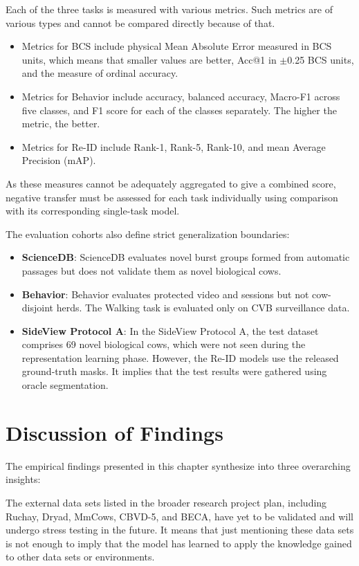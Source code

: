 Each of the three tasks is measured with various metrics. Such metrics are of various types and cannot be compared directly because of that.
\begin{itemize}
 \item Metrics for BCS include physical Mean Absolute Error measured in BCS units, which means that smaller values are better, Acc@1 in $\pm$0.25 BCS units, and the measure of ordinal accuracy.
 \item Metrics for Behavior include accuracy, balanced accuracy, Macro-F1 across five classes, and F1 score for each of the classes separately. The higher the metric, the better.
 \item Metrics for Re-ID include Rank-1, Rank-5, Rank-10, and mean Average Precision (mAP).
\end{itemize}
As these measures cannot be adequately aggregated to give a combined score, negative transfer must be assessed for each task individually using comparison with its corresponding single-task model.

The evaluation cohorts also define strict generalization boundaries:
\begin{itemize}
 \item \textbf{ScienceDB}: ScienceDB evaluates novel burst groups formed from automatic passages but does not validate them as novel biological cows.
 \item \textbf{Behavior}: Behavior evaluates protected video and sessions but not cow-disjoint herds. The Walking task is evaluated only on CVB surveillance data.
 \item \textbf{SideView Protocol A}: In the SideView Protocol A, the test dataset comprises 69 novel biological cows, which were not seen during the representation learning phase. However, the Re-ID models use the released ground-truth masks. It implies that the test results were gathered using oracle segmentation.
\end{itemize}

\section{Discussion of Findings}

The empirical findings presented in this chapter synthesize into three overarching insights:

The external data sets listed in the broader research project plan, including Ruchay, Dryad, MmCows, CBVD-5, and BECA, have yet to be validated and will undergo stress testing in the future. It means that just mentioning these data sets is not enough to imply that the model has learned to apply the knowledge gained to other data sets or environments.

